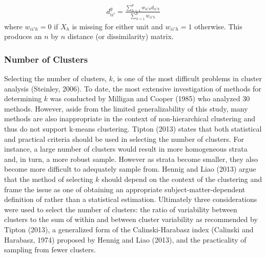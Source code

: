\documentclass[man]{apa6}
\begin{document}
\begin{align}
  d^{g}_{ii'} = \frac{\sum^p_{h = 1}w_{ii'h}d_{ii'h}}{\sum^p_{h = 1}w_{ii'h}}
\end{align}
where \(w_{ii'h} = 0\) if \(X_h\) is missing for either unit and \(w_{ii'h} = 1\) otherwise. This produces an \(n\) by \(n\) distance (or dissimilarity) matrix.

\hypertarget{number-of-clusters}{%
\subsubsection{Number of Clusters}\label{number-of-clusters}}

Selecting the number of clusters, \(k\), is one of the most difficult problems in cluster analysis (Steinley, 2006). To date, the most extensive investigation of methods for determining \(k\) was conducted by Milligan and Cooper (1985) who analyzed 30 methods. However, aside from the limited generalizability of this study, many methods are also inappropriate in the context of non-hierarchical clustering and thus do not support k-means clustering. Tipton (2013) states that both statistical and practical criteria should be used in selecting the number of clusters. For instance, a large number of clusters would result in more homogeneous strata and, in turn, a more robust sample. However as strata become smaller, they also become more difficult to adequately sample from. Hennig and Liao (2013) argue that the method of selecting \(k\) should depend on the context of the clustering and frame the issue as one of obtaining an appropriate subject-matter-dependent definition of rather than a statistical estimation. Ultimately three considerations were used to select the number of clusters: the ratio of variability between clusters to the sum of within and between cluster variability as recommended by Tipton (2013), a generalized form of the Calinski-Harabasz index (Calinski and Harabasz, 1974) proposed by Hennig and Liao (2013), and the practicality of sampling from fewer clusters.
\end{document}

